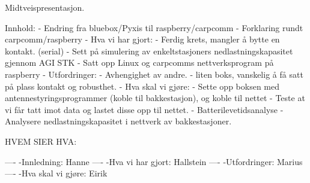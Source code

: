 Midtveispresentasjon.

Innhold:
- Endring fra bluebox/Pyxis til raspberry/carpcomm
- Forklaring rundt carpcomm/raspberry
- Hva vi har gjort:
	- Ferdig krets, mangler å bytte en kontakt. (serial)
	- Sett på simulering av enkeltstasjoners nedlastningskapasitet gjennom AGI STK
	- Satt opp Linux og carpcomms nettverksprogram på raspberry
- Utfordringer:
	- Avhengighet av andre.
	- liten boks, vanskelig å få satt på plass kontakt og robusthet.
- Hva skal vi gjøre:
	- Sette opp boksen med antennestyringsprogrammer (koble til bakkestasjon), og koble til nettet
	- Teste at vi får tatt imot data og lastet disse opp til nettet.
	- Batterilevetidsanalyse
	- Analysere nedlastningskapasitet i nettverk av bakkestasjoner.

HVEM SIER HVA:

----
-Innledning: Hanne
----
-Hva vi har gjort: Hallstein
----
-Utfordringer: Marius
----
-Hva skal vi gjøre: Eirik